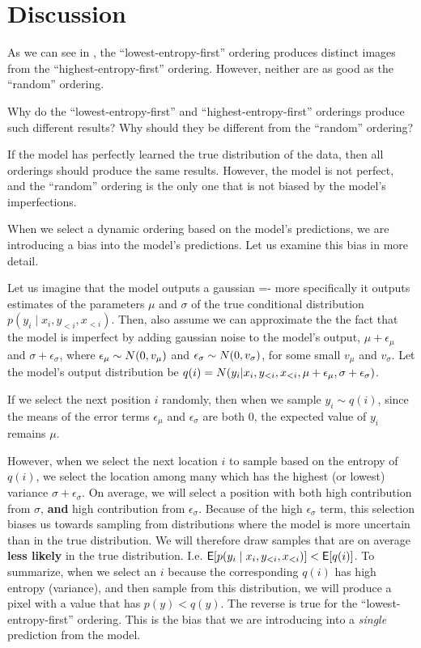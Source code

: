 \section{Discussion}
\label{s:a-o-discussion}

As we can see in , the ``lowest-entropy-first'' ordering produces distinct images from the ``highest-entropy-first'' ordering. However, neither are as good as the ``random'' ordering.

Why do the ``lowest-entropy-first'' and ``highest-entropy-first'' orderings produce such different results? Why should they be different from the ``random'' ordering?

If the model has perfectly learned the true distribution of the data, then all orderings should produce the same results. However, the model is not perfect, and the ``random'' ordering is the only one that is not biased by the model's imperfections.

When we select a dynamic ordering based on the model's predictions, we are introducing a bias into the model's predictions. Let us examine this bias in more detail.

Let us imagine that the model outputs a gaussian =- more specifically it outputs estimates of the parameters $\mu$ and $\sigma$ of the true conditional distribution $p(y_i \mid x_i, y_{<i}, x_{<i})$. Then, also assume we can approximate the the fact that the model is imperfect by adding gaussian noise to the model's output, $\mu + \epsilon_\mu$ and $\sigma + \epsilon_\sigma$, where $\epsilon_\mu \sim \relax{N}(0, v_\mu)$ and $\epsilon_\sigma \sim \relax{N}(0, v_\sigma)$, for some small $v_\mu$ and $v_\sigma$. Let the model's output distribution be $q(i) = \relax{N}(y_i | x_i, y_{<i}, x_{<i}, \mu + \epsilon_\mu, \sigma + \epsilon_\sigma)$.

If we select the next position $i$ randomly, then when we sample $y_i \sim q(i)$, since the means of the error terms $\epsilon_\mu$ and $\epsilon_\sigma$ are both 0, the expected value of $y_i$ remains $\mu$.

However, when we select the next location $i$ to sample based on the entropy of $q(i)$, we select the location among many which has the highest (or lowest) variance $\sigma + \epsilon_\sigma$. On average, we will select a position with both high contribution from $\sigma$, \textbf{and} high contribution  from $\epsilon_\sigma$. Because of the high $\epsilon_\sigma$ term, this selection biases us towards sampling from distributions where the model is more uncertain than in the true distribution. We will therefore draw samples that are on average \textbf{less likely} in the true distribution. I.e. $\mathsf{E}[p(y_i \mid x_i, y_{<i}, x_{<i})] < \mathsf{E}[q(i)]$. To summarize, when we select an $i$ because the corresponding $q(i)$ has high entropy (variance), and then sample from this distribution, we will produce a pixel with a value that has $p(y) < q(y)$. The reverse is true for the ``lowest-entropy-first'' ordering. This is the bias that we are introducing into a \textit{single} prediction from the model.

